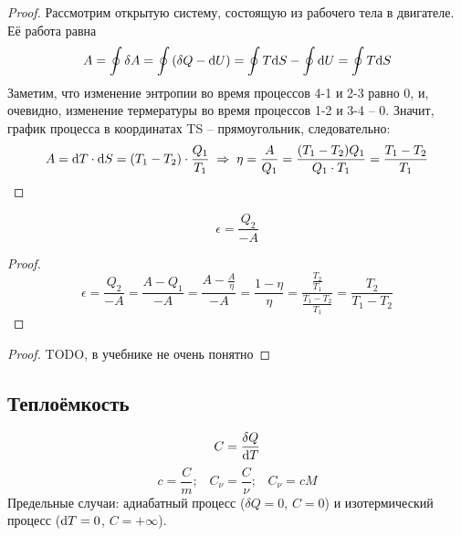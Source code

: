 \begin{proof}
	Рассмотрим открытую систему, состоящую из рабочего тела в двигателе. Её работа равна
	\[A=\oint{\delta A}=\oint{(\delta Q - \text{d}U)}=\oint{T \text{d}S} - \oint{\text{d}U}=\oint{T \text{d}S}\]
	Заметим, что изменение энтропии во время процессов 4-1 и 2-3 равно 0, и, очевидно, изменение термературы во время процессов 1-2 и 3-4 -- 0. Значит, график процесса в координатах TS -- прямоугольник, следовательно:
	\[A=\text{d} T \cdot \text{d} S=(T_1-T_2)\cdot\frac{Q_1}{T_1}
	\;\Rightarrow\;
	\eta=\frac{A}{Q_1}=\frac{(T_1-T_2)Q_1}{Q_1\cdot T_1}=\frac{T_1-T_2}{T_1}\]
\end{proof}

\[\epsilon = \frac{Q_2}{-A}\]
\begin{proof}
	\[\epsilon = \frac{Q_2}{-A} = \frac{A-Q_1}{-A} = \frac{A-\frac{A}{\eta}}{-A} =
	\frac{1-\eta}{\eta} = \frac{\frac{T_2}{T_1}}{\frac{T_1-T_2}{T_1}} = \frac{T_2}{T_1-T_2} \]
\end{proof}

\begin{proof}
TODO, в учебнике не очень понятно\par
\end{proof}



\subsection{Теплоёмкость}
\[C=\frac{\delta Q}{\text{d} T}\]
\[c = \frac{C}{m} \text{;} \quad
C_\nu = \frac{C}{\nu} \text{;} \quad
C_\nu = cM\]
Предельные случаи: адиабатный процесс ($\delta Q = 0$, $C = 0$) и изотермический процесс ($\text{d} T = 0$, $C = +\infty$).\par


